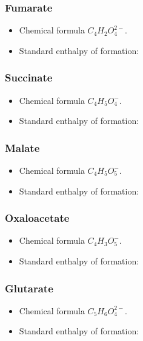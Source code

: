 \documentclass{article}
\begin{document}
\subsubsection{Fumarate}
\begin{itemize}
    \item Chemical formula $C_4H_2O_4^{2-}$.
    \item Standard enthalpy of formation:
\end{itemize}

\subsubsection{Succinate}
\begin{itemize}
    \item Chemical formula $C_4H_5O_4^-$.
    \item Standard enthalpy of formation:
\end{itemize}

\subsubsection{Malate}
\begin{itemize}
    \item Chemical formula $C_4H_5O_5^-$.
    \item Standard enthalpy of formation:
\end{itemize}

\subsubsection{Oxaloacetate}
\begin{itemize}
    \item Chemical formula $C_4H_3O_5^-$.
    \item Standard enthalpy of formation:
\end{itemize}

\subsubsection{Glutarate}
\begin{itemize}
    \item Chemical formula $C_5H_6O_4^{2-}$.
    \item Standard enthalpy of formation:
\end{itemize}
\end{document}
